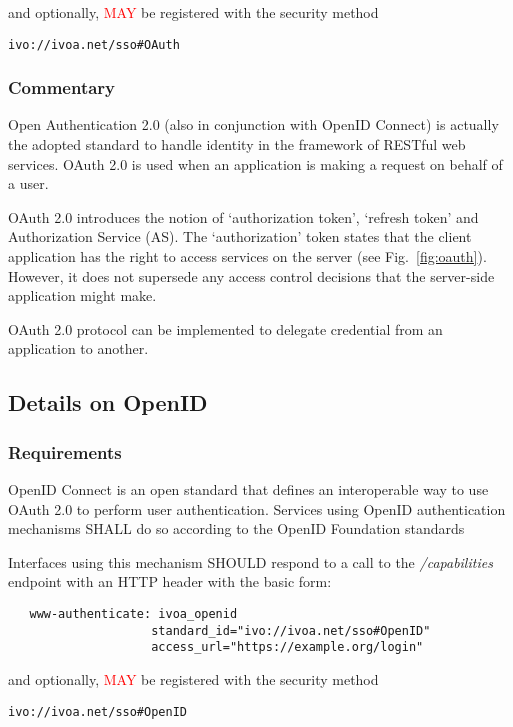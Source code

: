 \documentclass[11pt,a4paper]{ivoa}
\begin{document}
\noindent and optionally, \textcolor{red}{MAY} be registered with the security
method

\texttt{ivo://ivoa.net/sso\#OAuth}


\subsubsection{Commentary}
Open Authentication 2.0 (also in conjunction with OpenID Connect) is
actually the adopted standard
to handle identity in the framework of RESTful web services.
OAuth 2.0 is used when an application is making a request on behalf of a
user.

OAuth 2.0 introduces the notion of  `authorization token',  `refresh
token' and Authorization Service (AS).
The `authorization' token states that the client application has the
right to access services on the server  (see Fig.~\ref{fig:oauth}).
However, it does not supersede any access control decisions that the
server-side application might make.

OAuth 2.0 protocol can be implemented  to delegate credential from an
application to another.

\subsection{Details on OpenID}
\subsubsection{Requirements}
OpenID Connect is an open standard that defines an
interoperable way to use OAuth 2.0 to perform user authentication.
Services using OpenID authentication mechanisms SHALL do so according to
the OpenID Foundation standards \citep{std:openid}

Interfaces using this mechanism SHOULD respond to a call to the
\emph{/capabilities} endpoint with an HTTP header with the basic form:
\begin{verbatim}
   www-authenticate: ivoa_openid
                    standard_id="ivo://ivoa.net/sso#OpenID"
                    access_url="https://example.org/login"
\end{verbatim}

\noindent and optionally, \textcolor{red}{MAY}  be registered with the security
method

\texttt{ivo://ivoa.net/sso\#OpenID}
\end{document}
